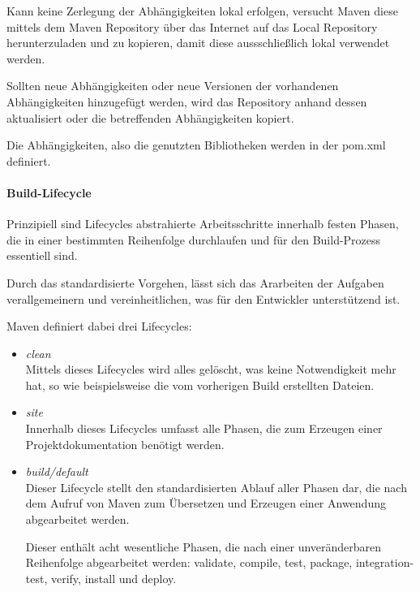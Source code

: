 Kann keine Zerlegung der Abhängigkeiten lokal erfolgen, versucht Maven diese mittels dem Maven Repository über das Internet auf das Local Repository herunterzuladen und zu kopieren, damit diese aussschließlich lokal verwendet werden.\cite[S. 115]{spiller_maven_2011}   

Sollten neue Abhängigkeiten oder neue Versionen der vorhandenen Abhängigkeiten hinzugefügt werden, wird das Repository anhand dessen aktualisiert oder die betreffenden Abhängigkeiten kopiert. 

Die Abhängigkeiten, also die genutzten Bibliotheken werden in der pom.xml definiert. 

\paragraph{Build-Lifecycle}

Prinzipiell sind Lifecycles abstrahierte Arbeitsschritte innerhalb festen Phasen, die in einer bestimmten Reihenfolge durchlaufen und für den Build-Prozess essentiell sind. \cite[S. 57]{varanasi_introducing_2019}  

Durch das standardisierte Vorgehen, lässt sich das Ararbeiten der Aufgaben verallgemeinern und vereinheitlichen, was für den Entwickler unterstützend ist.

Maven definiert dabei drei Lifecycles\cite[S. 72 - 76]{spiller_maven_2011}: 

\begin{itemize}
    \item \textit{clean}\\
    Mittels dieses Lifecycles wird alles gelöscht, was keine Notwendigkeit mehr hat, so wie beispielsweise die vom vorherigen Build erstellten Dateien. 

    \item \textit{site}\\
    Innerhalb dieses Lifecycles umfasst alle Phasen, die zum Erzeugen einer Projektdokumentation benötigt werden.
    
    \item \textit{build/default}\\
    Dieser Lifecycle stellt den standardisierten Ablauf aller Phasen dar, die nach dem Aufruf von Maven zum Übersetzen und Erzeugen einer Anwendung abgearbeitet werden. 
    
    Dieser enthält acht wesentliche Phasen, die nach einer unveränderbaren Reihenfolge abgearbeitet werden: validate, compile, test, package, integration-test, verify, install und deploy.  

\end{itemize}

